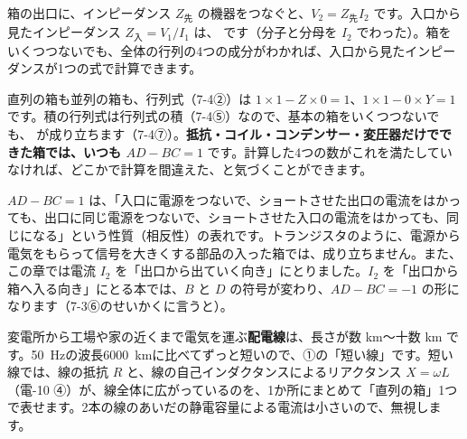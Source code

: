 箱の出口に、インピーダンス $Z_{\text{先}}$ の機器をつなぐと、$V_2=Z_{\text{先}}I_2$ です。入口から見たインピーダンス $Z_{\text{入}}=V_1/I_1$ は、
\label{ph:電-13:zin}です（分子と分母を $I_2$ でわった）。箱をいくつつないでも、全体の行列の4つの成分がわかれば、入口から見たインピーダンスが1つの式で計算できます。

直列の箱も並列の箱も、行列式（7-4②）は $1\times1-Z\times0=1$、$1\times1-0\times Y=1$ です。積の行列式は行列式の積（7-4⑤）なので、基本の箱をいくつつないでも、
が成り立ちます（7-4⑦）。\textbf{抵抗・コイル・コンデンサー・変圧器だけでできた箱では、いつも $AD-BC=1$} です。計算した4つの数がこれを満たしていなければ、どこかで計算を間違えた、と気づくことができます。

\begin{seikaku}
$AD-BC=1$ は、「入口に電源をつないで、ショートさせた出口の電流をはかっても、出口に同じ電源をつないで、ショートさせた入口の電流をはかっても、同じになる」という性質（相反性）の表れです。トランジスタのように、電源から電気をもらって信号を大きくする部品の入った箱では、成り立ちません。また、この章では電流 $I_2$ を「出口から出ていく向き」にとりました。$I_2$ を「出口から箱へ入る向き」にとる本では、$B$ と $D$ の符号が変わり、$AD-BC=-1$ の形になります（7-3⑥のせいかくに言うと）。
\end{seikaku}

\label{ph:電-13:sec4}
変電所から工場や家の近くまで電気を運ぶ\textbf{配電線}は、長さが数 km〜十数 km です。\qty{50}{Hz}の波長\qty{6000}{km}に比べてずっと短いので、①の「短い線」です。短い線では、線の抵抗 $R$ と、線の自己インダクタンスによるリアクタンス $X=\omega L$（電-10 ④）が、線全体に広がっているのを、1か所にまとめて「直列の箱」1つで表せます。2本の線のあいだの静電容量による電流は小さいので、無視します。

